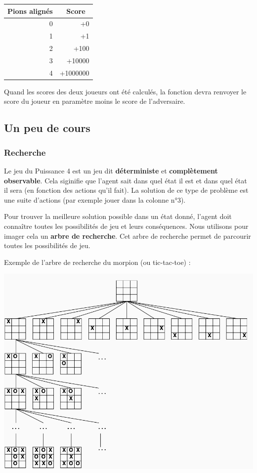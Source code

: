 \documentclass[11pt]{article}
\begin{document}
\begin{center}
\begin{tabular}{rr}
Pions alignés & Score \\[0pt]
\hline
0 & +0\\[0pt]
1 & +1\\[0pt]
2 & +100\\[0pt]
3 & +10000\\[0pt]
4 & +1000000\\[0pt]
\end{tabular}
\end{center}

Quand les scores des deux joueurs ont été calculés, la fonction devra renvoyer le score du joueur en paramètre moins le score de l'adversaire.

\subsection*{Un peu de cours}
\label{sec:org1effec5}
\subsubsection*{Recherche}
\label{sec:org5e9c9da}
Le jeu du Puissance 4 est un jeu dit \textbf{déterministe} et \textbf{complètement observable}. Cela siginifie que l'agent sait dans quel état il est et dans quel état il sera (en fonction des actions qu'il fait). La solution de ce type de problème est une suite d'actions (par exemple \og jouer dans la colonne n°3\fg{}).

Pour trouver la meilleure solution possible dans un état donné, l'agent doit connaître toutes les possibilités de jeu et leurs conséquences. Nous utilisons pour imager cela un \textbf{arbre de recherche}. Cet arbre de recherche permet de parcourir toutes les possibilités de jeu.

Exemple de l'arbre de recherche du morpion (ou tic-tac-toe) :

\begin{center}
\includegraphics[width=.9\linewidth]{./img/arbre-recherche.png}
\end{center}
\end{document}
